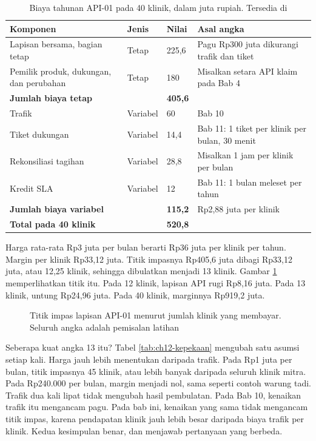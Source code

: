 \begin{table}[!htb]
  \centering
  \caption{Biaya tahunan API-01 pada 40 klinik, dalam juta rupiah. Tersedia di }
  \label{tab:ch12-biaya}
  \footnotesize
  \begin{tabularx}{\textwidth}{H{4.6cm}H{1.3cm}H{1.3cm}G}
    \hline
    \textbf{Komponen} & \textbf{Jenis} & \textbf{Nilai} & \textbf{Asal angka} \\ \hline
    Lapisan bersama, bagian tetap & Tetap & 225,6 & Pagu Rp300 juta dikurangi trafik dan tiket \\ \hline
    Pemilik produk, dukungan, dan perubahan & Tetap & 180 & Misalkan setara API klaim pada Bab 4 \\ \hline
    \textbf{Jumlah biaya tetap} & & \textbf{405,6} & \\ \hline
    Trafik & Variabel & 60 & Bab 10 \\ \hline
    Tiket dukungan & Variabel & 14,4 & Bab 11: 1 tiket per klinik per bulan, 30 menit \\ \hline
    Rekonsiliasi tagihan & Variabel & 28,8 & Misalkan 1 jam per klinik per bulan \\ \hline
    Kredit SLA & Variabel & 12 & Bab 11: 1 bulan meleset per tahun \\ \hline
    \textbf{Jumlah biaya variabel} & & \textbf{115,2} & Rp2,88 juta per klinik \\ \hline
    \textbf{Total pada 40 klinik} & & \textbf{520,8} & \\ \hline
  \end{tabularx}
\end{table}

Harga rata-rata Rp3 juta per bulan berarti Rp36 juta per klinik per tahun. Margin per klinik Rp33,12 juta. Titik impasnya Rp405,6 juta
dibagi Rp33,12 juta, atau 12,25 klinik, sehingga dibulatkan menjadi 13 klinik. Gambar \ref{fig:ch12-impas} memperlihatkan titik itu.
Pada 12 klinik, lapisan API rugi Rp8,16 juta. Pada 13 klinik, untung Rp24,96 juta. Pada 40 klinik, marginnya Rp919,2 juta.

\begin{figure}[!htb]
  \centering
  
  \caption{Titik impas lapisan API-01 menurut jumlah klinik yang membayar. Seluruh angka adalah pemisalan latihan}
  \label{fig:ch12-impas}
\end{figure}

Seberapa kuat angka 13 itu? Tabel \ref{tab:ch12-kepekaan} mengubah satu asumsi setiap kali. Harga jauh lebih menentukan daripada trafik.
Pada Rp1 juta per bulan, titik impasnya 45 klinik, atau lebih banyak daripada seluruh klinik mitra. Pada Rp240.000 per bulan, margin
menjadi nol, sama seperti contoh warung tadi. Trafik dua kali lipat tidak mengubah hasil pembulatan. Pada Bab 10, kenaikan trafik itu
mengancam pagu. Pada bab ini, kenaikan yang sama tidak mengancam titik impas, karena pendapatan klinik jauh lebih besar daripada biaya
trafik per klinik. Kedua kesimpulan benar, dan menjawab pertanyaan yang berbeda.

